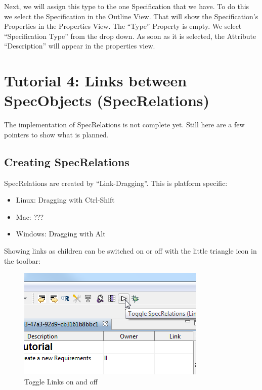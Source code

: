 Next, we will assign this type to the one Specification that we have. To
do this we select the Specification in the Outline View. That will show
the Specification's Properties in the Properties View. The ``Type''
Property is empty. We select ``Specification Type'' from the drop down.
As soon as it is selected, the Attribute ``Description'' will appear in
the properties view.

\section{Tutorial 4: Links between SpecObjects (SpecRelations)}

The implementation of SpecRelations is not complete yet. Still here are
a few pointers to show what is planned.

\subsection{Creating SpecRelations}

SpecRelations are created by ``Link-Dragging''. This is platform
specific:

\begin{itemize}

\item
  Linux: Dragging with Ctrl-Shift
\item
  Mac: ???
\item
  Windows: Dragging with Alt
\end{itemize}

Showing links as children can be switched on or off with the little
triangle icon in the toolbar:

\begin{figure}[h!]
\centering      
\includegraphics[width=0.8\linewidth]{../rmf-images/pror_toggle_links.png}      
\caption{Toggle Links on and off}      
\label{fig:toggleLinks}
\end{figure}

